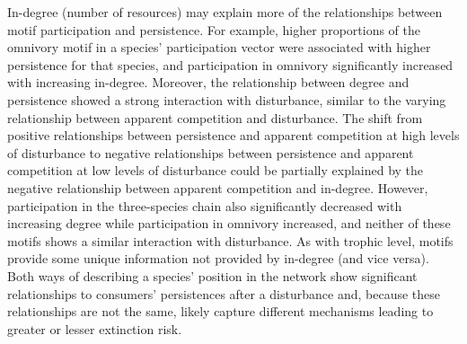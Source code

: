 \documentclass[12pt]{article}
\begin{document}
\begin{spacing}{2.0}
    
    In-degree (number of resources) may explain more of the relationships between motif participation and persistence.
    For example, higher proportions of the omnivory motif in a species' participation vector were associated with higher persistence for that species, and participation in omnivory significantly increased with increasing in-degree.
    Moreover, the relationship between degree and persistence  showed a strong interaction with disturbance, similar to the varying relationship between apparent competition and disturbance. 
    The shift from positive relationships between persistence and apparent competition at high levels of disturbance to negative relationships between persistence and apparent competition at low levels of disturbance could be partially explained by the negative relationship between apparent competition and in-degree.
    However, participation in the three-species chain also significantly decreased with increasing degree while participation in omnivory increased, and neither of these motifs shows a similar interaction with disturbance.
    As with trophic level, motifs provide some unique information not provided by in-degree (and vice versa). 
    Both ways of describing a species' position in the network show significant relationships to consumers' persistences after a disturbance and, because these relationships are not the same, likely capture different mechanisms leading to greater or lesser extinction risk.
    
    
    


 

\end{spacing}
\end{document}
